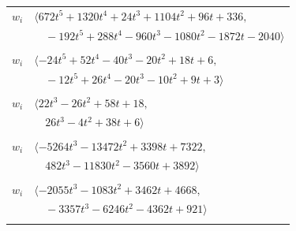 \documentclass[11pt]{article}
\begin{document}
\begin{longtable}{@{}ll@{}}
$w_i$ & $\langle 672t^{5}+1320t^{4}+24t^{3}+1104t^{2}+96t+336,$\\
 & $\quad -192t^{5}+288t^{4}-960t^{3}-1080t^{2}-1872t-2040\rangle$\\
\addlinespace[2pt]
\multicolumn{2}{@{}p{0.97\textwidth}@{}}{$i=52$, $D_i=4$, $\rho_{ij}$: $3{:}1, \allowbreak 5{:}1, \allowbreak 6{:}1, \allowbreak 8{:}1, \allowbreak 13{:}2, \allowbreak 15{:}1, \allowbreak 21{:}1, \allowbreak 23{:}2, \allowbreak 37{:}1, \allowbreak 45{:}2, \allowbreak 54{:}2$}\\
$w_i$ & $\langle -24t^{5}+52t^{4}-40t^{3}-20t^{2}+18t+6,$\\
 & $\quad -12t^{5}+26t^{4}-20t^{3}-10t^{2}+9t+3\rangle$\\
\addlinespace[2pt]
\multicolumn{2}{@{}p{0.97\textwidth}@{}}{$i=53$, $D_i=2$, $\rho_{ij}$: $0{:}1, \allowbreak 8{:}2, \allowbreak 11{:}2, \allowbreak 19{:}1, \allowbreak 27{:}2, \allowbreak 31{:}2, \allowbreak 33{:}1, \allowbreak 58{:}1, \allowbreak 68{:}1$}\\
$w_i$ & $\langle 22t^{3}-26t^{2}+58t+18,$\\
 & $\quad 26t^{3}-4t^{2}+38t+6\rangle$\\
\addlinespace[2pt]
\multicolumn{2}{@{}p{0.97\textwidth}@{}}{$i=54$, $D_i=16$, $\rho_{ij}$: $7{:}1, \allowbreak 9{:}1, \allowbreak 10{:}1, \allowbreak 11{:}1, \allowbreak 22{:}1, \allowbreak 28{:}1, \allowbreak 33{:}1, \allowbreak 36{:}1, \allowbreak 40{:}1, \allowbreak 44{:}2, \allowbreak 45{:}1, \allowbreak 46{:}1, \allowbreak 52{:}1, \allowbreak 55{:}2, \allowbreak 63{:}1, \allowbreak 67{:}2$}\\
$w_i$ & $\langle -5264t^{3}-13472t^{2}+3398t+7322,$\\
 & $\quad 482t^{3}-11830t^{2}-3560t+3892\rangle$\\
\addlinespace[2pt]
\multicolumn{2}{@{}p{0.97\textwidth}@{}}{$i=55$, $D_i=2$, $\rho_{ij}$: $3{:}2, \allowbreak 11{:}2, \allowbreak 12{:}2, \allowbreak 13{:}1, \allowbreak 27{:}2, \allowbreak 28{:}2, \allowbreak 36{:}1, \allowbreak 54{:}1, \allowbreak 57{:}2, \allowbreak 63{:}1, \allowbreak 64{:}1$}\\
$w_i$ & $\langle -2055t^{3}-1083t^{2}+3462t+4668,$\\
 & $\quad -3357t^{3}-6246t^{2}-4362t+921\rangle$\\
\addlinespace[2pt]
\multicolumn{2}{@{}p{0.97\textwidth}@{}}{$i=56$, $D_i=4$, $\rho_{ij}$: $0{:}1, \allowbreak 4{:}1, \allowbreak 8{:}2, \allowbreak 12{:}2, \allowbreak 24{:}1, \allowbreak 27{:}2, \allowbreak 28{:}2, \allowbreak 30{:}2, \allowbreak 43{:}1, \allowbreak 59{:}2$}\\

\end{longtable}
\end{document}
